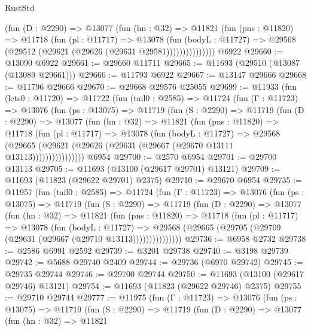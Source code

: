 \begin{lexlean}{RustStd}
\begin{coremodule}
                (fun (D : @2290) =>
                @13077
                  (fun (hn : @32) =>
                  @11821
                    (fun (pns : @11820) =>
                    @11718
                      (fun (pl : @11717) =>
                      @13078
                        (fun (bodyL : @11727) =>
                        @29568 (@29512 (@29621 (@29626 (@29631 @29581)))))))))))))))
    @6922
@29660 := @13090 @6922
@29661 := @29660 @11711
@29665 := @11693 (@29510 (@13087 (@13089 @29661)))
@29666 := @11793 @6922
@29667 := @13147 @29666
@29668 := @11796 @29666
@29670 := @29668 @29576 @25055
@29699 := @11933
    (fun (lets0 : @11720) =>
    @11722
      (fun (tail0 : @2585) =>
      @11724
        (fun (Γ : @11723) =>
        @13076
          (fun (ps : @13075) =>
          @11719
            (fun (S : @2290) =>
            @11719
              (fun (D : @2290) =>
              @13077
                (fun (hn : @32) =>
                @11821
                  (fun (pns : @11820) =>
                  @11718
                    (fun (pl : @11717) =>
                    @13078
                      (fun (bodyL : @11727) =>
                      @29568
                        (@29665
                          (@29621 (@29626 (@29631 (@29667 (@29670 @13111 @13113))))))))))))))))
    @6954
@29700 := @2570 @6954
@29701 := @29700 @13113
@29705 := @11693 (@13100 (@29617 @29701) @13121)
@29709 := @11693 (@11823 (@29622 @29701) @2375)
@29710 := @29670 @6954
@29735 := @11957
    (fun (tail0 : @2585) =>
    @11724
      (fun (Γ : @11723) =>
      @13076
        (fun (ps : @13075) =>
        @11719
          (fun (S : @2290) =>
          @11719
            (fun (D : @2290) =>
            @13077
              (fun (hn : @32) =>
              @11821
                (fun (pns : @11820) =>
                @11718
                  (fun (pl : @11717) =>
                  @13078
                    (fun (bodyL : @11727) =>
                    @29568 (@29665 (@29705 (@29709 (@29631 (@29667 (@29710 @13113)))))))))))))))
@29736 := @6958 @2732
@29738 := @2586 @6991 @2592
@29739 := @3201 @29738
@29740 := @3198 @29739
@29742 := @5688 @29740 @2409
@29744 := @29736 (@6970 @29742)
@29745 := @29735 @29744
@29746 := @29700 @29744
@29750 := @11693 (@13100 (@29617 @29746) @13121)
@29754 := @11693 (@11823 (@29622 @29746) @2375)
@29755 := @29710 @29744
@29777 := @11975
    (fun (Γ : @11723) =>
    @13076
      (fun (ps : @13075) =>
      @11719
        (fun (S : @2290) =>
        @11719
          (fun (D : @2290) =>
          @13077
            (fun (hn : @32) =>
            @11821

\end{coremodule}
\end{lexlean}
